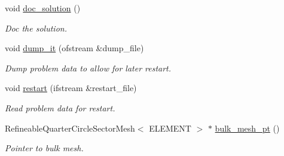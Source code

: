 \begin{DoxyCompactItemize}
void \hyperlink{classRefineableUnsteadyHeatProblem_a77d590171785b6b5f4070af9401c0e37}{doc\+\_\+solution} ()
\begin{DoxyCompactList}\small\item\em Doc the solution. \end{DoxyCompactList}\item 
void \hyperlink{classRefineableUnsteadyHeatProblem_a1fb939c3f9c258fd49328bb1516ced98}{dump\+\_\+it} (ofstream \&dump\+\_\+file)
\begin{DoxyCompactList}\small\item\em Dump problem data to allow for later restart. \end{DoxyCompactList}\item 
void \hyperlink{classRefineableUnsteadyHeatProblem_af36fa71e72852367411e21b50b179625}{restart} (ifstream \&restart\+\_\+file)
\begin{DoxyCompactList}\small\item\em Read problem data for restart. \end{DoxyCompactList}\item 
Refineable\+Quarter\+Circle\+Sector\+Mesh$<$ E\+L\+E\+M\+E\+NT $>$ $\ast$ \hyperlink{classRefineableUnsteadyHeatProblem_a4d8eec1505a3c53960a3182ec462b4e7}{bulk\+\_\+mesh\+\_\+pt} ()
\begin{DoxyCompactList}\small\item\em Pointer to bulk mesh. \end{DoxyCompactList}\end{DoxyCompactItemize}
